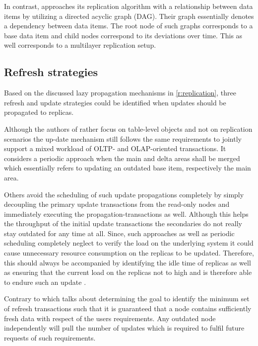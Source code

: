 In contrast, \cite{xiang:2008} approaches its replication algorithm with a relationship between data items by utilizing a directed acyclic graph (DAG).
Their graph essentially denotes a dependency between data items. The root node of such graphs corresponds to a base data item and child nodes correspond 
to its deviations over time. This as well corresponds to a multilayer replication setup.





\subsection{Refresh strategies}
\label{r:strategies}
Based on the discussed lazy propagation mechanisms in \ref{r:replication}, three refresh and update strategies could be identified when updates should be propagated 
to replicas.

Although the authors of \cite{psaroudakis:2015} rather focus on table-level objects and not on replication scenarios the up-date mechanism 
still follows the same requirements to jointly support a mixed workload of OLTP- and OLAP-oriented transactions.
It considers a periodic approach when the main and delta areas shall be merged which essentially refers to updating an outdated base item, respectively the main area.

Others \cite{rohm:2002} avoid the scheduling of such update propagations completely by simply decoupling the primary update transactions from the read-only nodes
and immediately executing the propagation-transactions as well. Although this helps the throughput of the initial update transactions the secondaries do not really 
stay outdated for any time at all. Since, such approaches as well as periodic scheduling completely neglect to verify the load on the underlying system it could 
cause unnecessary resource consumption on the replicas to be updated. Therefore, this should always be accompanied by identifying the idle time of replicas as well 
as ensuring that the current load on the replicas not to high and is therefore able to endure such an update \cite{voicu:2010}.

Contrary to \cite{peralta:2006} which talks about determining the goal to identify the minimum set of refresh transactions such that it is guaranteed that a node contains 
sufficiently fresh data with respect of the users requirements. Any outdated node independently will pull the number of updates which is required to fulfil future requests 
of such requirements.

